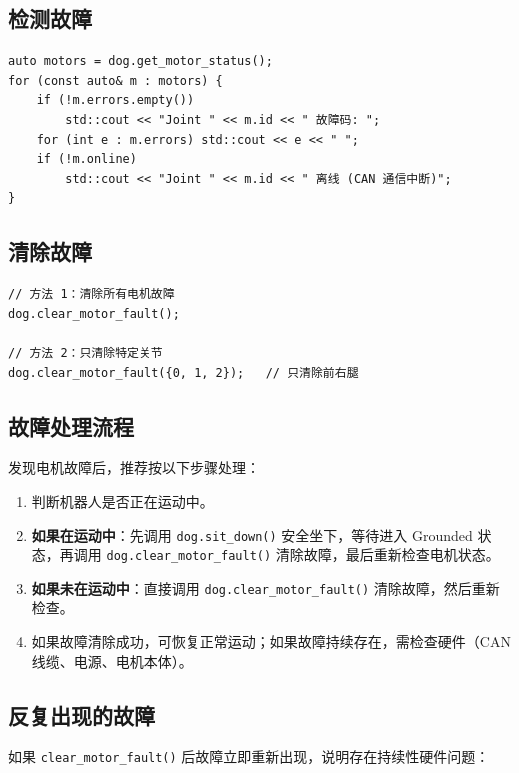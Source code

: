 \documentclass[a4paper,11pt,openany]{book}
\begin{document}
\subsection{检测故障}

\begin{lstlisting}[style=cpp]
auto motors = dog.get_motor_status();
for (const auto& m : motors) {
    if (!m.errors.empty())
        std::cout << "Joint " << m.id << " 故障码: ";
    for (int e : m.errors) std::cout << e << " ";
    if (!m.online)
        std::cout << "Joint " << m.id << " 离线 (CAN 通信中断)";
}
\end{lstlisting}

\subsection{清除故障}

\begin{lstlisting}[style=cpp]
// 方法 1：清除所有电机故障
dog.clear_motor_fault();

// 方法 2：只清除特定关节
dog.clear_motor_fault({0, 1, 2});   // 只清除前右腿
\end{lstlisting}

\subsection{故障处理流程}

发现电机故障后，推荐按以下步骤处理：

\begin{enumerate}
  \item 判断机器人是否正在运动中。
  \item \textbf{如果在运动中}：先调用 \texttt{dog.sit\_down()} 安全坐下，等待进入 Grounded 状态，再调用 \texttt{dog.clear\_motor\_fault()} 清除故障，最后重新检查电机状态。
  \item \textbf{如果未在运动中}：直接调用 \texttt{dog.clear\_motor\_fault()} 清除故障，然后重新检查。
  \item 如果故障清除成功，可恢复正常运动；如果故障持续存在，需检查硬件（CAN 线缆、电源、电机本体）。
\end{enumerate}

\subsection{反复出现的故障}

如果 \texttt{clear\_motor\_fault()} 后故障立即重新出现，说明存在持续性硬件问题：
\end{document}
